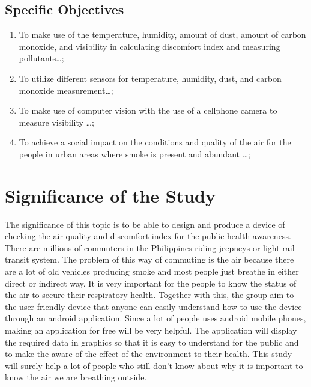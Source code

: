 \subsection{Specific Objectives}

\begin{enumerate}

	\item To make use of the temperature, humidity, amount of dust, amount of carbon monoxide, and visibility in calculating discomfort index and measuring pollutants\ldots;

	\item To utilize different sensors for temperature, humidity, dust, and carbon monoxide measurement\ldots;
	
	\item To make use of computer vision with the use of a cellphone camera to measure visibility \ldots;
	
	\item To achieve a social impact on the conditions and quality of the air for the people in urban areas where smoke is present and abundant \ldots;
	
\end{enumerate}



\section{Significance of the Study}

The significance of this topic is to be able to design and produce a device of checking the air quality and discomfort index for the public health awareness. There are millions of commuters in the Philippines riding jeepneys or light rail transit system. The problem of this way of commuting is the air because there are a lot of old vehicles producing smoke and most people just breathe in either direct or indirect way. It is very important for the people to know the status of the air to secure their respiratory health. Together with this, the group aim to the user friendly device that anyone can easily understand how to use the device through an android application. Since a lot of people uses android mobile phones, making an application for free will be very helpful. The application will display the required data in graphics so that it is easy to understand for the public and to make the aware of the effect of the environment to their health. This study will surely help a lot of people who still don’t know about why it is important to know the air we are breathing outside.


